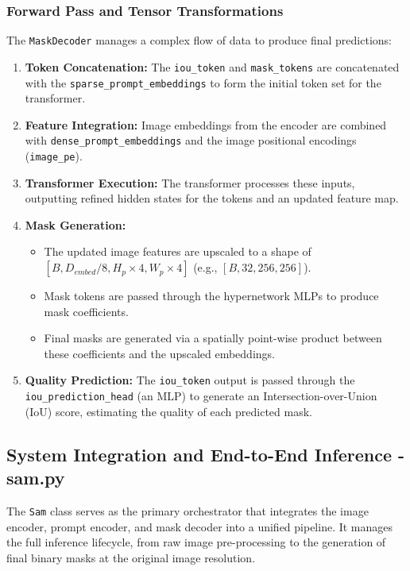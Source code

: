 \subsubsection{Forward Pass and Tensor Transformations}
The \texttt{MaskDecoder} manages a complex flow of data to produce final predictions:
\begin{enumerate}
	\item \textbf{Token Concatenation:} The \texttt{iou\_token} and \texttt{mask\_tokens} are concatenated with the \texttt{sparse\_prompt\_embeddings} to form the initial token set for the transformer.
	\item \textbf{Feature Integration:} Image embeddings from the encoder are combined with \texttt{dense\_prompt\_embeddings} and the image positional encodings (\texttt{image\_pe}).
	\item \textbf{Transformer Execution:} The transformer processes these inputs, outputting refined hidden states for the tokens and an updated feature map.
	\item \textbf{Mask Generation:} 
	\begin{itemize}
		\item The updated image features are upscaled to a shape of\\ $[B, D_{embed}/8, H_{p} \times 4, W_{p} \times 4]$ (e.g., $[B, 32, 256, 256]$).
		\item Mask tokens are passed through the hypernetwork MLPs to produce mask coefficients.
		\item Final masks are generated via a spatially point-wise product between these coefficients and the upscaled embeddings.
	\end{itemize}
	\item \textbf{Quality Prediction:} The \texttt{iou\_token} output is passed through the \texttt{iou\_prediction\_head} (an MLP) to generate an Intersection-over-Union (IoU) score, estimating the quality of each predicted mask.
\end{enumerate}

\subsection{System Integration and End-to-End Inference - sam.py}
The \texttt{Sam} class serves as the primary orchestrator that integrates the image encoder, prompt encoder, and mask decoder into a unified pipeline. It manages the full inference lifecycle, from raw image pre-processing to the generation of final binary masks at the original image resolution.

